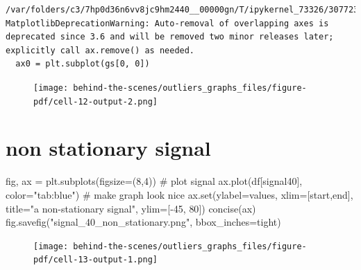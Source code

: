 \documentclass[
  letterpaper,
  DIV=11,
  numbers=noendperiod,
  oneside]{scrreprt}
\newenvironment{Shaded}{\begin{snugshade}}{\end{snugshade}}
\newcommand{\BuiltInTok}[1]{\textcolor[rgb]{0.00,0.23,0.31}{#1}}
\newcommand{\CommentTok}[1]{\textcolor[rgb]{0.37,0.37,0.37}{#1}}
\newcommand{\DecValTok}[1]{\textcolor[rgb]{0.68,0.00,0.00}{#1}}
\newcommand{\NormalTok}[1]{\textcolor[rgb]{0.00,0.23,0.31}{#1}}
\newcommand{\OperatorTok}[1]{\textcolor[rgb]{0.37,0.37,0.37}{#1}}
\newcommand{\StringTok}[1]{\textcolor[rgb]{0.13,0.47,0.30}{#1}}
\begin{document}
\begin{verbatim}
/var/folders/c3/7hp0d36n6vv8jc9hm2440__00000gn/T/ipykernel_73326/3077230861.py:6: MatplotlibDeprecationWarning: Auto-removal of overlapping axes is deprecated since 3.6 and will be removed two minor releases later; explicitly call ax.remove() as needed.
  ax0 = plt.subplot(gs[0, 0])
\end{verbatim}

\begin{figure}[H]

{\centering \texttt{[image: behind-the-scenes/outliers\_graphs\_files/figure-pdf/cell-12-output-2.png]}

}

\end{figure}

\hypertarget{non-stationary-signal}{%
\section{non stationary signal}\label{non-stationary-signal}}

\begin{Shaded}
\begin{Highlighting}[]
\NormalTok{fig, ax }\OperatorTok{=}\NormalTok{ plt.subplots(figsize}\OperatorTok{=}\NormalTok{(}\DecValTok{8}\NormalTok{,}\DecValTok{4}\NormalTok{))}
\CommentTok{\# plot signal}
\NormalTok{ax.plot(df[}\StringTok{\textquotesingle{}signal40\textquotesingle{}}\NormalTok{], color}\OperatorTok{=}\StringTok{"tab:blue"}\NormalTok{)}
\CommentTok{\# make graph look nice}
\NormalTok{ax.}\BuiltInTok{set}\NormalTok{(ylabel}\OperatorTok{=}\StringTok{\textquotesingle{}values\textquotesingle{}}\NormalTok{,}
\NormalTok{       xlim}\OperatorTok{=}\NormalTok{[start,end],}
\NormalTok{       title}\OperatorTok{=}\StringTok{"a non{-}stationary signal"}\NormalTok{,}
\NormalTok{       ylim}\OperatorTok{=}\NormalTok{[}\OperatorTok{{-}}\DecValTok{45}\NormalTok{, }\DecValTok{80}\NormalTok{])}
\NormalTok{concise(ax)}
\NormalTok{fig.savefig(}\StringTok{"signal\_40\_non\_stationary.png"}\NormalTok{, bbox\_inches}\OperatorTok{=}\StringTok{\textquotesingle{}tight\textquotesingle{}}\NormalTok{)}
\end{Highlighting}
\end{Shaded}

\begin{figure}[H]

{\centering \texttt{[image: behind-the-scenes/outliers\_graphs\_files/figure-pdf/cell-13-output-1.png]}

}

\end{figure}
\end{document}

